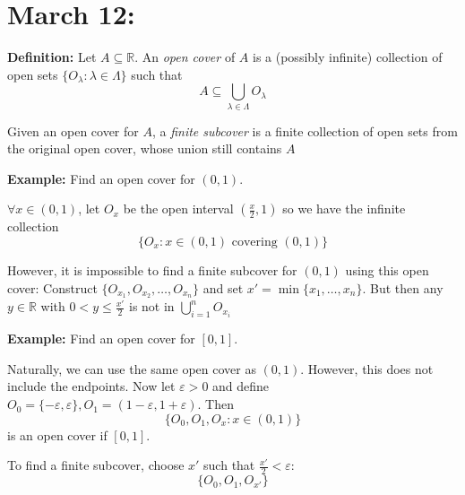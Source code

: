 \documentclass[12pt]{report}
\newcommand{\R}{\mathbb{R}}
\newcommand{\ep}{\varepsilon}
\begin{document}
\section*{March 12:}
    \textbf{Definition:} Let $A \subseteq \R$. An \emph{open cover} of $A$ is a (possibly infinite) collection of open sets $\{O_{\lambda}: \lambda \in \Lambda\}$ such that 
    \[A \subseteq \bigcup_{\lambda \in \Lambda} O_{\lambda}\]

    Given an open cover for $A$, a \emph{finite subcover} is a finite collection of open sets from the original open cover, whose union still contains $A$

    \textbf{Example:} Find an open cover for $(0, 1)$. 

    $\forall x \in (0, 1)$, let $O_x$ be the open interval $(\frac{x}{2}, 1)$ so we have the infinite collection 
    \[\{O_x: x \in (0, 1) \text{ covering } (0, 1)\}\]

    However, it is impossible to find a finite subcover for $(0, 1)$ using this open cover: Construct $\{O_{x_1}, O_{x_2}, \dots, O_{x_n}\}$ and set $x' = \min\{x_1, \dots, x_n\}$. But then any $y \in \R$ with $0 < y \leq \frac{x'}{2}$ is not in $\bigcup_{i=1}^{n} O_{x_i}$ 

    \textbf{Example:} Find an open cover for $[0, 1]$. 

    Naturally, we can use the same open cover as $(0, 1)$. However, this does not include the endpoints. Now let $\ep > 0$ and define $O_0 = \{-\ep, \ep\}, O_1 = (1 - \ep, 1 + \ep)$. Then
    \[\{O_0, O_1, O_x: x \in (0, 1)\}\] 
    is an open cover if $[0, 1]$. 

    To find a finite subcover, choose $x'$ such that $\frac{x'}{2} < \ep$:  
    \[\{O_0, O_1, O_{x'}\}\]
\end{document}

